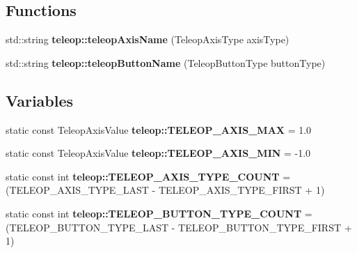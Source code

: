 \subsection*{Functions}
\begin{DoxyCompactItemize}
\item 
std::string {\bf teleop::teleopAxisName} (TeleopAxisType axisType)
\item 
std::string {\bf teleop::teleopButtonName} (TeleopButtonType buttonType)
\end{DoxyCompactItemize}
\subsection*{Variables}
\begin{DoxyCompactItemize}
\item 
static const TeleopAxisValue {\bf teleop::TELEOP\_\-AXIS\_\-MAX} = 1.0
\item 
static const TeleopAxisValue {\bf teleop::TELEOP\_\-AXIS\_\-MIN} = -\/1.0
\item 
static const int {\bf teleop::TELEOP\_\-AXIS\_\-TYPE\_\-COUNT} = (TELEOP\_\-AXIS\_\-TYPE\_\-LAST -\/ TELEOP\_\-AXIS\_\-TYPE\_\-FIRST + 1)
\item 
static const int {\bf teleop::TELEOP\_\-BUTTON\_\-TYPE\_\-COUNT} = (TELEOP\_\-BUTTON\_\-TYPE\_\-LAST -\/ TELEOP\_\-BUTTON\_\-TYPE\_\-FIRST + 1)
\end{DoxyCompactItemize}
